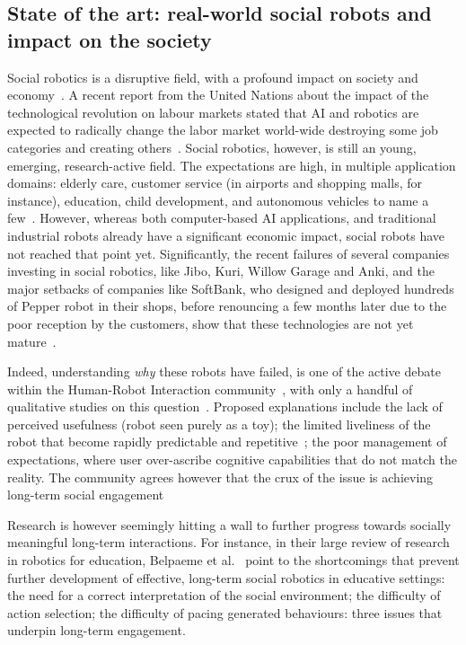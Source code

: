 \subsection{State of the art: real-world social robots and impact on the
society}

Social robotics is a disruptive field, with a profound impact on society and
economy~\parencite{williams2020social}. A recent report from the United Nations about
the impact of the technological revolution on labour markets stated that AI and
robotics are expected to radically change the labor market world-wide destroying
some job categories and creating others~\parencite{bruckner2017frontier}. Social
robotics, however, is still an young, emerging, research-active field. The
expectations are high, in multiple application domains: elderly care, customer
service (in airports and shopping malls, for instance), education, child
development, and autonomous vehicles to name a few~\parencite{baillie2019challenges}.
However, whereas both computer-based AI applications, and traditional industrial
robots already have a significant economic impact, social robots have not
reached that point yet. Significantly, the recent failures of several companies
investing in social robotics, like Jibo, Kuri, Willow Garage and Anki, and the
major setbacks of companies like SoftBank, who designed and deployed hundreds of
Pepper robot in their shops, before renouncing a few months later due to the poor
reception by the customers, show that these technologies are not yet
mature~\parencite{tulli2019great}.

Indeed, understanding \emph{why} these robots have failed, is one of the
active debate within the Human-Robot Interaction
community~\parencite{hoffman2019anki}, with only a handful of qualitative studies on
this question~\parencite{dereshev2019longterm,degraaf2017phased}. Proposed
explanations include the lack of perceived usefulness (robot seen purely as a
toy); the limited liveliness of the robot that become rapidly predictable and
repetitive~\parencite{lemaignan2014cognitive}; the poor management of expectations,
where user over-ascribe cognitive capabilities that do not match the reality.
The community agrees however that the crux of the issue is achieving long-term
social engagement~\parencite{yang2018grand,hoffman2019anki}

Research is however seemingly hitting a wall to further progress towards
socially meaningful long-term interactions. For instance, in their large review
of research in robotics for education, Belpaeme et al.~\parencite{belpaeme2018social}
point to the shortcomings that prevent further development of effective,
long-term social robotics in educative settings: the need for a correct
interpretation of the social environment; the difficulty of action selection;
the difficulty of pacing generated behaviours: three issues that underpin
long-term engagement.

